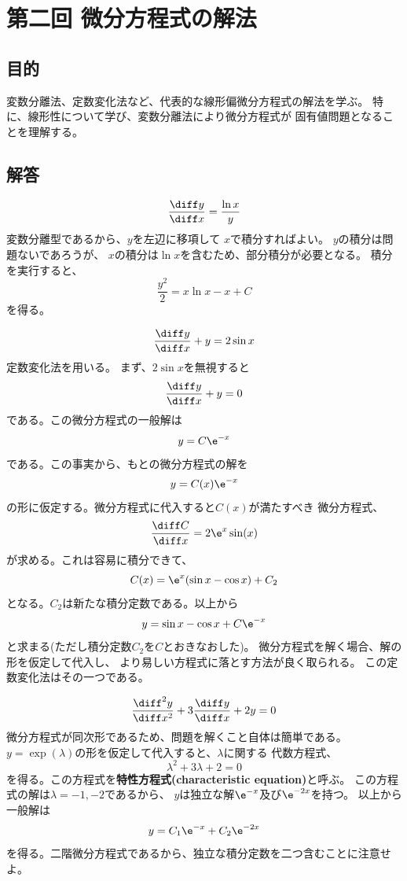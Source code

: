 
\section{第二回 微分方程式の解法}

\subsection{目的}
変数分離法、定数変化法など、代表的な線形偏微分方程式の解法を学ぶ。
特に、線形性について学び、変数分離法により微分方程式が
固有値問題となることを理解する。

\subsection{解答}

$$\frac{\diff y}{\diff x} = \frac{\ln x}{y} $$
変数分離型であるから、$y$を左辺に移項して
$x$で積分すればよい。
$y$の積分は問題ないであろうが、
$x$の積分は$\ln x$を含むため、部分積分が必要となる。
積分を実行すると、
\begin{equation}
  \frac{y^2}{2} = x \ln x - x + C
\end{equation}
を得る。

$$\frac{\diff y}{\diff x} + y= 2 \sin x $$
定数変化法を用いる。
まず、$2\sin x$を無視すると
\begin{equation}
  \frac{\diff y}{\diff x} + y= 0
\end{equation}
である。この微分方程式の一般解は
$$
  y = C \e^{-x}
$$
である。この事実から、もとの微分方程式の解を
$$
  y = C(x) \e^{-x}
$$
の形に仮定する。微分方程式に代入すると$C(x)$が満たすべき
微分方程式、
$$
  \frac{\diff C}{\diff x} =  2 \e^{x} \sin(x)
$$
が求める。これは容易に積分できて、
$$
  C(x) = \e^x (\sin x - \cos x) + C_2
$$
となる。$C_2$は新たな積分定数である。以上から
\begin{equation}
  y = \sin x - \cos x + C \e^{-x}
\end{equation}
と求まる(ただし積分定数$C_2$を$C$とおきなおした)。
微分方程式を解く場合、解の形を仮定して代入し、
より易しい方程式に落とす方法が良く取られる。
この定数変化法はその一つである。

$$\frac{\diff^2 y}{\diff x^2} + 3 \frac{\diff y}{\diff x} + 2y = 0 $$
微分方程式が同次形であるため、問題を解くこと自体は簡単である。
$y = \exp(\lambda)$の形を仮定して代入すると、$\lambda$に関する
代数方程式、
\begin{equation}
  \lambda^2 + 3 \lambda + 2 = 0
\end{equation}
を得る。この方程式を{\bf 特性方程式(characteristic equation)}と呼ぶ。
この方程式の解は$\lambda = -1, -2$であるから、
$y$は独立な解$\e^{-x}$及び$\e^{-2x}$を持つ。
以上から一般解は
$$
  y = C_1 \e^{-x} + C_2 \e^{-2x}
$$
を得る。二階微分方程式であるから、独立な積分定数を二つ含むことに注意せよ。

